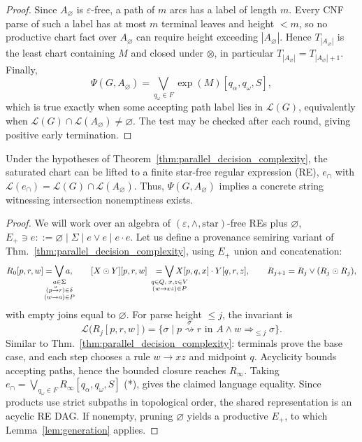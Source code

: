 \documentclass[popl.tex]{subfiles}
\begin{document}
\begin{proof}[Proof]
  Since \(A_\varnothing\) is \(\varepsilon\)-free, a path of \(m\) arcs has a label of length \(m\). Every CNF parse of such a label has at most \(m\) terminal leaves and height \(<m\), so no productive chart fact over \(A_\varnothing\) can require height exceeding \(|A_\varnothing|\). Hence \(T_{|A_\varnothing|}\) is the least chart containing $M$ and closed under $\otimes$, in particular $T_{|A_\varnothing|} = T_{|A_\varnothing| + 1}$. Finally,
  \[
    \Psi(G,A_\varnothing)=\bigvee_{q_\omega\in F}\exp(M)[q_\alpha,q_\omega,S],
  \]
  which is true exactly when some accepting path label lies in \(\mathcal L(G)\), equivalently when \(\mathcal L(G)\cap\mathcal L(A_\varnothing)\neq\varnothing\). The test may be checked after each round, giving positive early termination.
\end{proof}

\begin{theorem}\label{thm:witness_construction}
  Under the hypotheses of Theorem~\ref{thm:parallel_decision_complexity}, the saturated chart can be lifted to a finite star-free regular expression (RE), \(e_\cap\) with \(\mathcal{L}(e_\cap)=\mathcal{L}(G)\cap\mathcal{L}(A_\varnothing)\). Thus, \(\Psi(G,A_\varnothing)\) implies a concrete string witnessing intersection nonemptiness exists.
\end{theorem}

\begin{proof}
  We will work over an algebra of \((\varepsilon,\land, \text{star})\)-free REs plus \(\varnothing\), \(E_+ \ni e ::= \varnothing\mid \Sigma \mid e\vee e\mid e\cdot e\). Let us define a provenance semiring variant of Thm.~\ref{thm:parallel_decision_complexity}, using $E_+$ union and concatenation:
  \[
    \begin{aligned}
      R_0[p,r,w]&=\bigvee_{\mathclap{\substack{a\in\Sigma\\(p\overset{a}{\rightarrow}r)\in\delta\\(w\rightarrow a)\in P}}}a, \qquad [X\odot Y][p,r,w]&=\bigvee_{\mathclap{\substack{q\in Q,\;x,z\in V\\(w\rightarrow xz)\in P}}}
      X[p,q,x]\cdot Y[q,r,z],\qquad
      R_{j+1}=R_j\vee(R_j\odot R_j),
    \end{aligned}
  \]
  with empty joins equal to \(\varnothing\). For parse height \(\le j\), the invariant is
  \[
    \mathcal{L}\big(R_j[p,r,w]\big)=
    \{\sigma\mid p\overset{\sigma}{\rightsquigarrow}r\text{ in }A
    \land w\Rightarrow_{\le j}\sigma\}. \tag{*}
  \]
  Similar to Thm.~\ref{thm:parallel_decision_complexity}: terminals prove the base case, and each step chooses a rule \(w\rightarrow xz\) and midpoint \(q\). Acyclicity bounds accepting paths, hence the bounded closure reaches \(R_\infty\). Taking \(e_\cap=\bigvee_{q_\omega\in F}R_\infty[q_\alpha,q_\omega,S]\) (*), gives the claimed language equality. Since products use strict subpaths in topological order, the shared representation is an acyclic RE DAG. If nonempty, pruning \(\varnothing\) yields a productive $E_+$, to which Lemma~\ref{lem:generation} applies.
\end{proof}
\end{document}
